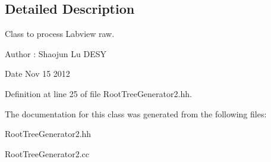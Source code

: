 \subsection{Detailed Description}
Class to process Labview raw. \begin{DoxyAuthor}{Author}
: Shaojun Lu DESY 
\end{DoxyAuthor}
\begin{DoxyDate}{Date}
Nov 15 2012 
\end{DoxyDate}


Definition at line 25 of file RootTreeGenerator2.hh.

The documentation for this class was generated from the following files:\begin{DoxyCompactItemize}
\item 
RootTreeGenerator2.hh\item 
RootTreeGenerator2.cc\end{DoxyCompactItemize}
